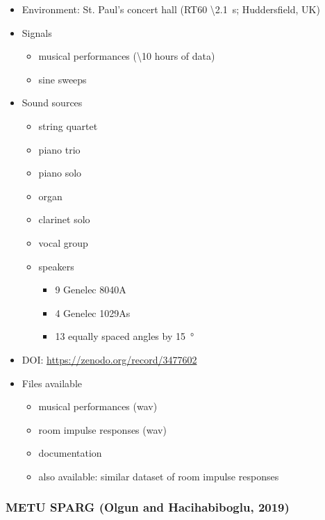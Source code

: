 \documentclass[14pt, oneside]{extarticle}
\begin{document}
\begin{itemize}
\item Environment: St. Paul's concert hall (RT60 \textbackslash \SI{2.1}{\second}; Huddersfield, UK)

\item Signals
	\begin{itemize}
	\item musical performances (\textbackslash 10 hours of data)
	\item sine sweeps
	\end{itemize}

\item Sound sources
	\begin{itemize}
	\item string quartet
	\item piano trio
	\item piano solo
	\item organ
	\item clarinet solo
	\item vocal group
	\item speakers
		\begin{itemize}
		\item 9 Genelec 8040A
		\item 4 Genelec 1029As
		\item 13 equally spaced angles by \SI{15}{\degree}
		\end{itemize}
	\end{itemize}

\item DOI: \href{10.5281/zenodo.3477602}{https://zenodo.org/record/3477602} 

\item Files available
	\begin{itemize}
	\item musical performances (wav)
	\item room impulse responses (wav)
	\item documentation
	\item also available: similar dataset of room impulse responses \cite{lee2017microphone}
	\end{itemize}

\end{itemize}

\subsubsection{METU SPARG (Olgun and Hacihabiboglu, 2019)}
\end{document}
